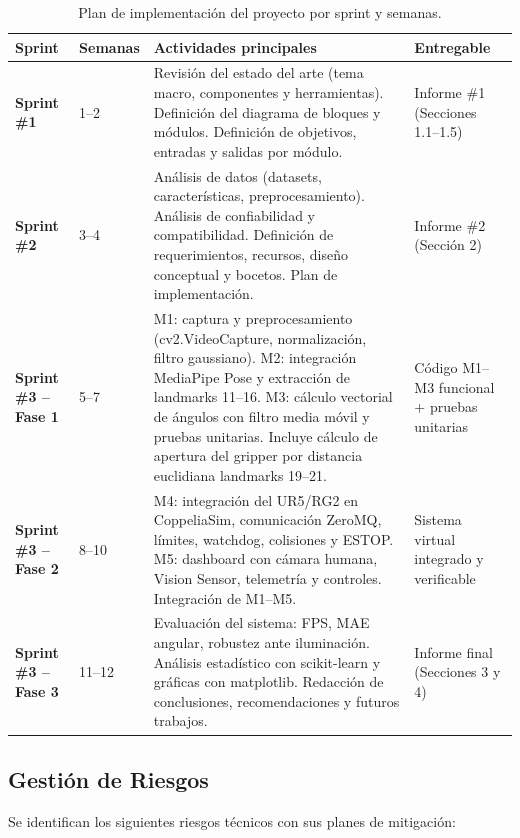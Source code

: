 \begin{table}[H]
\centering
\label{tab:plan_impl}
\renewcommand{\arraystretch}{1.3}
\begin{tabularx}{\textwidth}{
    >{\bfseries}p{1.5cm}
    p{1.6cm}
    X
    p{3.5cm}
}
\toprule
\textbf{Sprint} &
\textbf{Semanas} &
\textbf{Actividades principales} &
\textbf{Entregable} \\
\midrule
Sprint \#1 & 1--2 &
  Revisión del estado del arte (tema macro, componentes y herramientas).
  Definición del diagrama de bloques y módulos. Definición de objetivos,
  entradas y salidas por módulo. &
  Informe \#1 (Secciones 1.1--1.5) \\
\midrule
Sprint \#2 & 3--4 &
  Análisis de datos (datasets, características, preprocesamiento).
  Análisis de confiabilidad y compatibilidad. Definición de
  requerimientos, recursos, diseño conceptual y bocetos. Plan de
  implementación. &
  Informe \#2 (Sección 2) \\
\midrule
Sprint \#3 -- Fase 1 & 5--7 &
  M1: captura y preprocesamiento (cv2.VideoCapture, normalización,
  filtro gaussiano). M2: integración MediaPipe Pose y extracción de
  landmarks 11--16. M3: cálculo vectorial de ángulos con filtro media
  móvil y pruebas unitarias. Incluye cálculo de apertura del gripper por distancia euclidiana landmarks 19–21. &
  Código M1--M3 funcional + pruebas unitarias \\
\midrule
Sprint \#3 -- Fase 2 & 8--10 &
  M4: integración del UR5/RG2 en CoppeliaSim, comunicación ZeroMQ, límites,
  watchdog, colisiones y ESTOP. M5: dashboard con cámara humana, Vision Sensor,
  telemetría y controles. Integración de M1--M5. &
  Sistema virtual integrado y verificable \\
\midrule
Sprint \#3 -- Fase 3 & 11--12 &
  Evaluación del sistema: FPS, MAE angular, robustez ante iluminación.
  Análisis estadístico con scikit-learn y gráficas con matplotlib.
  Redacción de conclusiones, recomendaciones y futuros trabajos. &
  Informe final (Secciones 3 y 4) \\
\bottomrule
\end{tabularx}
\caption{Plan de implementación del proyecto por sprint y semanas.}
\end{table}

\subsection{Gestión de Riesgos}

Se identifican los siguientes riesgos técnicos con sus planes de
mitigación:

